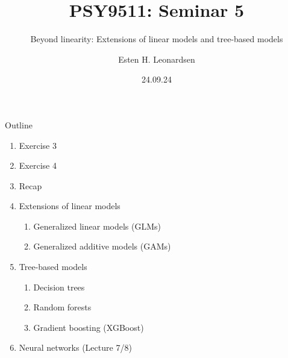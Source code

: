 \documentclass{beamer}
\title{PSY9511: Seminar 5}
\subtitle{Beyond linearity: Extensions of linear models and tree-based models}
\author{Esten H. Leonardsen}
\date{24.09.24}
\begin{document}
	\begin{frame}
	 	\maketitle
	\end{frame}

    \begin{frame}{Outline}
        \begin{enumerate}
            \item Exercise 3
            \item Exercise 4
            \item Recap
            \item Extensions of linear models
            \begin{enumerate}
                \item Generalized linear models (GLMs)
                \item Generalized additive models (GAMs)
            \end{enumerate}
            \item Tree-based models
            \begin{enumerate}
                \item Decision trees
                \item Random forests
                \item Gradient boosting (XGBoost)
            \end{enumerate}
            \item Neural networks (Lecture 7/8)
        \end{enumerate}
    \end{frame}

    
\end{document}
